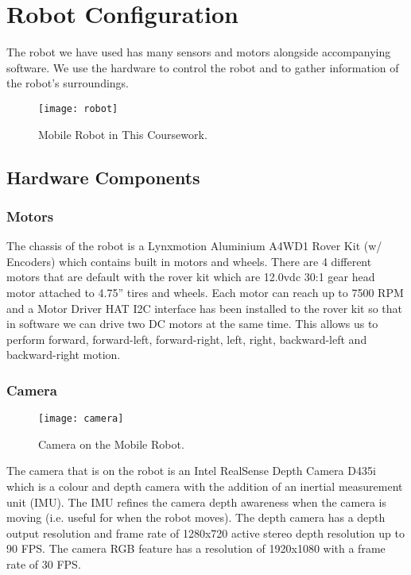\chapter{Robot Configuration}
\label{chap:configuration}

The robot we have used has many sensors and motors alongside accompanying software. We use the hardware to control the robot and to gather information of the robot’s surroundings. 

\begin{figure}
\centering
\texttt{[image: robot]}
\caption{Mobile Robot in This Coursework.}
\label{fig:robot}
\end{figure}

\section{Hardware Components}
\subsection{Motors}
The chassis of the robot is a Lynxmotion Aluminium A4WD1 Rover Kit (w/ Encoders) which contains built in motors and wheels. There are 4 different motors that are default with the rover kit which are 12.0vdc 30:1 gear head motor attached to 4.75” tires and wheels. Each motor can reach up to 7500 RPM and a Motor Driver HAT I2C interface has been installed to the rover kit so that in software we can drive two DC motors at the same time. This allows us to perform forward, forward-left, forward-right, left, right, backward-left and backward-right motion. 

\subsection{Camera}

\begin{figure}
\centering
\texttt{[image: camera]}
\caption{Camera on the Mobile Robot.}
\label{fig:camera}
\end{figure}

The camera that is on the robot is an Intel RealSense Depth Camera D435i which is a colour and depth camera with the addition of an inertial measurement unit (IMU). The IMU refines the camera depth awareness when the camera is moving (i.e. useful for when the robot moves). The depth camera has a depth output resolution and frame rate of 1280x720 active stereo depth resolution up to 90 FPS. The camera RGB feature has a resolution of 1920x1080 with a frame rate of 30 FPS.

